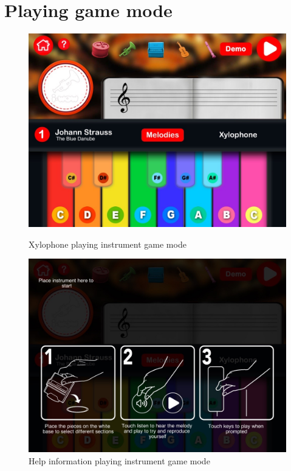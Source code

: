 \section{Playing game mode}

\begin{figure}[ht!]
  \centering
  \includegraphics[width=350pt]{graphics/use-case/playing_xylo_start_screen.jpg}
  \vspace{0.05cm}
  \caption{Xylophone playing instrument game mode}
  \vspace{0.6cm}

  \includegraphics[width=350pt]{graphics/use-case/help_playing_screen.jpg}
  \vspace{0.05cm}
  \caption{Help information playing instrument game mode}
\end{figure}

